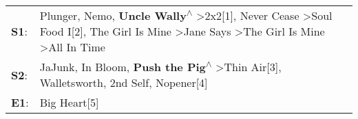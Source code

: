 \begin{supertabular}{p{0.03\textwidth}p{0.92\textwidth}}
 \textbf{S1}:  &  Plunger\textsuperscript{}, \enspace Nemo\textsuperscript{}, \enspace \textbf{Uncle Wally\textsuperscript{$\wedge$}} \textgreater \enspace 2x2[1]\textsuperscript{}, \enspace Never Cease\textsuperscript{} \textgreater \enspace Soul Food I[2]\textsuperscript{}, \enspace The Girl Is Mine\textsuperscript{} \textgreater \enspace Jane Says\textsuperscript{} \textgreater \enspace The Girl Is Mine\textsuperscript{} \textgreater \enspace All In Time\textsuperscript{}  \enspace  \\
 \textbf{S2}:  &                                                                                                                                                                               JaJunk\textsuperscript{}, \enspace In Bloom\textsuperscript{}, \enspace \textbf{Push the Pig\textsuperscript{$\wedge$}} \textgreater \enspace Thin Air[3]\textsuperscript{}, \enspace Walletsworth\textsuperscript{}, \enspace 2nd Self\textsuperscript{}, \enspace Nopener[4]\textsuperscript{}  \enspace  \\
 \textbf{E1}:  &                                                                                                                                                                                                                                                                                                                                                                                                                                                 Big Heart[5]\textsuperscript{}  \enspace  \\
\end{supertabular}
